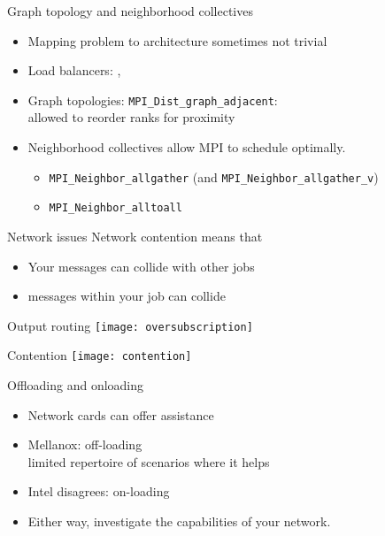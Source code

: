 \begin{numberedframe}{Graph topology and neighborhood collectives}
  \begin{itemize}
  \item Mapping problem to architecture sometimes not trivial
  \item Load balancers: , 
  \item Graph topologies: \lstinline{MPI_Dist_graph_adjacent}:\\
    allowed to reorder ranks for proximity
  \item Neighborhood collectives allow MPI to schedule optimally.
    \begin{itemize}
    \item \lstinline{MPI_Neighbor_allgather} (and \lstinline{MPI_Neighbor_allgather_v})
    \item \lstinline{MPI_Neighbor_alltoall}
    \end{itemize}
  \end{itemize}
\end{numberedframe}

\begin{numberedframe}{Network issues}
  Network contention means that
  \begin{itemize}
  \item Your messages can collide with other jobs
  \item messages within your job can collide
  \end{itemize}
\end{numberedframe}

\begin{numberedframe}{Output routing}
  \texttt{[image: oversubscription]}
\end{numberedframe}

\begin{numberedframe}{Contention}
  \texttt{[image: contention]}
\end{numberedframe}

\begin{numberedframe}{Offloading and onloading}

  \begin{itemize}
  \item Network cards can offer assistance
  \item Mellanox: off-loading\\
    limited repertoire of scenarios where it helps
  \item Intel disagrees: on-loading
  \item Either way, investigate the capabilities of your network.
  \end{itemize}
\end{numberedframe}

